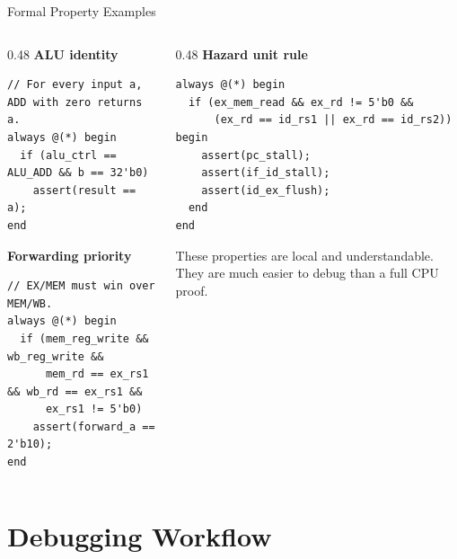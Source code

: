 \documentclass[aspectratio=169,10pt]{beamer}
\begin{document}
\begin{frame}[fragile]{Formal Property Examples}
  \begin{columns}[T]
    \begin{column}{0.48\textwidth}
      \textbf{ALU identity}
\begin{lstlisting}
// For every input a, ADD with zero returns a.
always @(*) begin
  if (alu_ctrl == ALU_ADD && b == 32'b0)
    assert(result == a);
end
\end{lstlisting}

      \vspace{0.5em}
      \textbf{Forwarding priority}
\begin{lstlisting}
// EX/MEM must win over MEM/WB.
always @(*) begin
  if (mem_reg_write && wb_reg_write &&
      mem_rd == ex_rs1 && wb_rd == ex_rs1 &&
      ex_rs1 != 5'b0)
    assert(forward_a == 2'b10);
end
\end{lstlisting}
    \end{column}
    \begin{column}{0.48\textwidth}
      \textbf{Hazard unit rule}
\begin{lstlisting}
always @(*) begin
  if (ex_mem_read && ex_rd != 5'b0 &&
      (ex_rd == id_rs1 || ex_rd == id_rs2)) begin
    assert(pc_stall);
    assert(if_id_stall);
    assert(id_ex_flush);
  end
end
\end{lstlisting}

      \vspace{0.5em}
      \small
      These properties are local and understandable. They are much easier to debug than a full CPU proof.
    \end{column}
  \end{columns}
\end{frame}

\section{Debugging Workflow}
\end{document}
